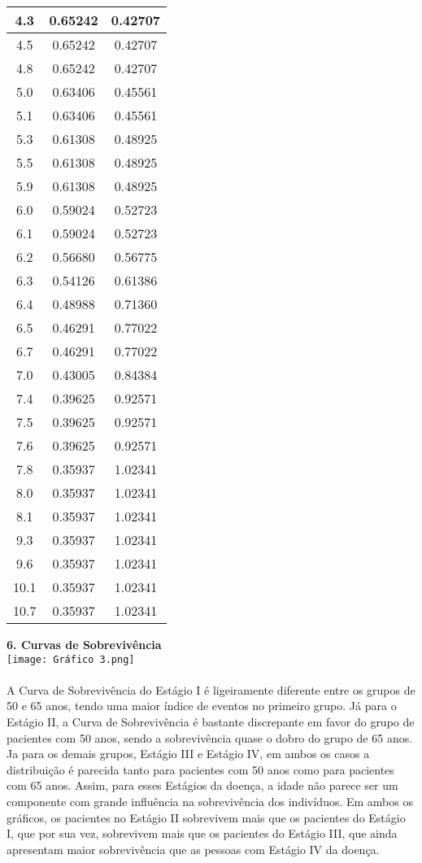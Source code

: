 \documentclass[12pt,a4paper]{article}
\begin{document}
\begin{center}
\begin{tabular}{|c|c|c|}
 			4.3 & 0.65242 & 0.42707\\ \hline
 			4.5 & 0.65242 & 0.42707\\ \hline
 			4.8 & 0.65242 & 0.42707\\ \hline
 			5.0 & 0.63406 & 0.45561\\ \hline
 			5.1 & 0.63406 & 0.45561\\ \hline
 			5.3 & 0.61308 & 0.48925\\ \hline
 			5.5 & 0.61308 & 0.48925\\ \hline
 			5.9 & 0.61308 & 0.48925\\ \hline
 			6.0 & 0.59024 & 0.52723\\ \hline
 			6.1 & 0.59024 & 0.52723\\ \hline
 			6.2 & 0.56680 & 0.56775\\ \hline
 			6.3 & 0.54126 & 0.61386\\ \hline
 			6.4 & 0.48988 & 0.71360\\ \hline
 			6.5 & 0.46291 & 0.77022\\ \hline
 			6.7 & 0.46291 & 0.77022\\ \hline
 			7.0 & 0.43005 & 0.84384\\ \hline
 			7.4 & 0.39625 & 0.92571\\ \hline
 			7.5 & 0.39625 & 0.92571\\ \hline
 			7.6 & 0.39625 & 0.92571\\ \hline
 			7.8 & 0.35937 & 1.02341\\ \hline
 			8.0 & 0.35937 & 1.02341\\ \hline
 			8.1 & 0.35937 & 1.02341\\ \hline
 			9.3 & 0.35937 & 1.02341\\ \hline
 			9.6 & 0.35937 & 1.02341\\ \hline
 			10.1 & 0.35937 & 1.02341\\ \hline
 			10.7 & 0.35937 & 1.02341\\ \hline
 		\end{tabular}
 	\end{center}
 	\vspace{2cm}
 	\textbf{6. Curvas de Sobrevivência}
 	\vspace{1cm}\\
 	\texttt{[image: Gráfico 3.png]}\\
 	\vspace{1cm}\\
 	A Curva de Sobrevivência do Estágio I é ligeiramente diferente entre os grupos de 50 e 65 anos, tendo uma maior índice de eventos no primeiro grupo. Já para o Estágio II, a Curva de Sobrevivência é bastante discrepante em favor do grupo de pacientes com 50 anos, sendo a sobrevivência quase o dobro do grupo de 65 anos. Ja para os demais grupos, Estágio III e Estágio IV, em ambos os casos a distribuição é parecida tanto para pacientes com 50 anos como para pacientes com 65 anos. Assim, para esses Estágios da doença, a idade não parece ser um componente com grande influência na sobrevivência dos indivíduos. Em ambos os gráficos, os pacientes no Estágio II sobrevivem mais que os pacientes do Estágio I, que por sua vez, sobrevivem mais que os pacientes do Estágio III, que ainda apresentam maior sobrevivência que as pessoas com Estágio IV da doença.
\end{document}
